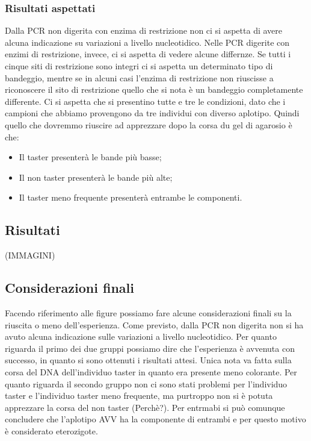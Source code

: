 		\subsubsection*{Risultati aspettati}
    
        Dalla PCR non digerita con enzima di restrizione non ci si aspetta di avere alcuna indicazione su variazioni a livello nucleotidico. 
        Nelle PCR digerite con enzimi di restrizione, invece, ci si aspetta di vedere alcune differnze. Se tutti i cinque siti di restrizione sono integri ci si aspetta un determinato tipo di bandeggio, mentre se in alcuni casi l'enzima di restrizione non riuscisse a riconoscere il sito di restrizione quello che si nota è un bandeggio completamente differente. 
        Ci si aspetta che si presentino tutte e tre le condizioni, dato che i campioni che abbiamo provengono da tre individui con diverso aplotipo. Quindi quello che dovremmo riuscire ad apprezzare dopo la corsa du gel di agarosio è che:
        \begin{itemize}
            \item Il taster presenterà le bande più basse; 
            \item Il non taster presenterà le bande più alte;
            \item Il taster meno frequente presenterà entrambe le componenti. 
        \end{itemize}
	
	\subsection*{Risultati}
	
		(IMMAGINI)

	\subsection*{Considerazioni finali}
	
	Facendo riferimento alle figure possiamo fare alcune considerazioni finali su la riuscita o meno dell'esperienza. 
	Come previsto, dalla PCR non digerita non si ha avuto alcuna indicazione sulle variazioni a livello nucleotidico.
	Per quanto riguarda il primo dei due gruppi possiamo dire che l'esperienza è avvenuta con successo, in quanto si sono ottenuti i risultati attesi. Unica nota va fatta sulla corsa del DNA dell'individuo taster in quanto era presente meno colorante. 
	Per quanto riguarda il secondo gruppo non ci sono stati problemi per l'individuo taster e l'individuo taster meno frequente, ma purtroppo non si è potuta apprezzare la corsa del non taster (Perchè?). 
	Per entrmabi si può comunque concludere che l'aplotipo AVV ha la componente di entrambi e per questo motivo è considerato eterozigote. 
